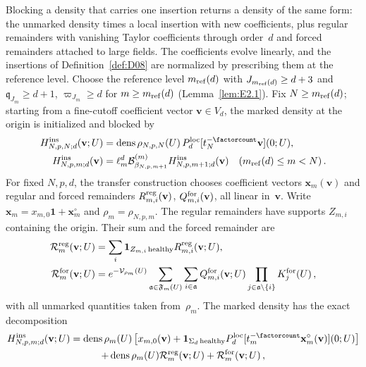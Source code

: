 Blocking a density that carries one insertion returns a density of the same form: the unmarked density times a local insertion with new coefficients, plus regular remainders with vanishing Taylor coefficients through order~$d$ and forced remainders attached to large fields. The coefficients evolve linearly, and the insertions of Definition~\ref{def:D08} are normalized by prescribing them at the reference level. Choose the reference level $m_{\mathrm{ref}}(d)$ with $J_{m_{\mathrm{ref}}(d)}\ge d+3$ and $\mathfrak q_{J_m}\ge d+1$, $\varpi_{J_m}\ge d$ for $m\ge m_{\mathrm{ref}}(d)$ (Lemma~\ref{lem:E2.1}). Fix $N\ge m_{\mathrm{ref}}(d)$; starting from a fine-cutoff coefficient vector $\mathbf v\in V_d$, the marked density at the origin is initialized and blocked by
\begin{align}\label{eq:I12-marked-evolution}
H^{\rm ins}_{N,p,N;d}(\mathbf v;U)
&=\density\rho_{N,p,N}(U)\,
\localsection{d}[t_N^{-\factorcount}\mathbf v](0;U),\\
H^{\rm ins}_{N,p,m;d}(\mathbf v)
&=\ell_m^d\blockmap{m}_{\beta_{N,p,m+1}}
H^{\rm ins}_{N,p,m+1;d}(\mathbf v)
\quad(\reflevel{d}\le m<N)\,.
\end{align}
For fixed $N,p,d$, the transfer construction chooses coefficient vectors $\mathbf x_m(\mathbf v)$ and regular and forced remainders $R_{m,i}^{\rm reg}(\mathbf v)$, $Q_{m,i}^{\rm for}(\mathbf v)$, all linear in~$\mathbf v$. Write $\mathbf x_m=x_{m,0}\mathbf1+\mathbf x_m^\circ$ and $\rho_m=\rho_{N,p,m}$. The regular remainders have supports $Z_{m,i}$ containing the origin. Their sum and the forced remainder are
\begin{align}\label{eq:I12-marked-remainders}
\mathcal R_m^{\rm reg}(\mathbf v;U)
&=\sum_i\mathbf1_{Z_{m,i}\,\mathrm{healthy}}R_{m,i}^{\rm reg}(\mathbf v;U),\notag\\
\mathcal R_m^{\rm for}(\mathbf v;U)
&=e^{-\mathcal V_{\rho_m}(U)}\sum_{\mathfrak a\in\mathfrak F_m(U)}\sum_{i\in\mathfrak a}
Q_{m,i}^{\rm for}(\mathbf v;U)\prod_{j\in\mathfrak a\setminus\{i\}}K_j^{\rm for}(U)\,,
\end{align}
with all unmarked quantities taken from~$\rho_m$. The marked density has the exact decomposition
\begin{multline}\label{eq:I12-marked-representation}
H^{\rm ins}_{N,p,m;d}(\mathbf v;U)=\density\rho_m(U)\left[
x_{m,0}(\mathbf v)+\mathbf1_{\Sigma_d\,\mathrm{healthy}}
\localsection{d}[t_m^{-\factorcount}\mathbf x_m^\circ(\mathbf v)](0;U)\right]\\
+\density\rho_m(U)\mathcal R_m^{\rm reg}(\mathbf v;U)
+\mathcal R_m^{\rm for}(\mathbf v;U)\,,
\end{multline}
